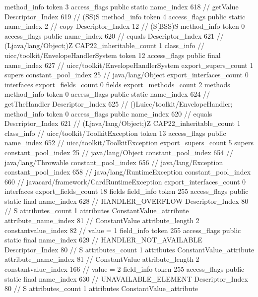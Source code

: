{{{{{				}
				method_info {
					token	3
					access_flags	public static
					name_index	618		// getValue
					Descriptor_Index	619		// (SS)S
				}
				method_info {
					token	4
					access_flags	public static
					name_index	2		// copy
					Descriptor_Index	12		// (S[BSS)S
				}
				method_info {
					token	0
					access_flags	public
					name_index	620		// equals
					Descriptor_Index	621		// (Ljava/lang/Object;)Z
				}
			}
			CAP22_inheritable_count	1
		}
		class_info {		// uicc/toolkit/EnvelopeHandlerSystem
			token	12
			access_flags	public final
			name_index	627		// uicc/toolkit/EnvelopeHandlerSystem
			export_supers_count	1
			supers {
				constant_pool_index	25		// java/lang/Object
			}
			export_interfaces_count	0
			interfaces {
			}
			export_fields_count	0
			fields {
			}
			export_methods_count	2
			methods {
				method_info {
					token	0
					access_flags	public static
					name_index	624		// getTheHandler
					Descriptor_Index	625		// ()Luicc/toolkit/EnvelopeHandler;
				}
				method_info {
					token	0
					access_flags	public
					name_index	620		// equals
					Descriptor_Index	621		// (Ljava/lang/Object;)Z
				}
			}
			CAP22_inheritable_count	1
		}
		class_info {		// uicc/toolkit/ToolkitException
			token	13
			access_flags	public
			name_index	652		// uicc/toolkit/ToolkitException
			export_supers_count	5
			supers {
				constant_pool_index	25		// java/lang/Object
				constant_pool_index	654		// java/lang/Throwable
				constant_pool_index	656		// java/lang/Exception
				constant_pool_index	658		// java/lang/RuntimeException
				constant_pool_index	660		// javacard/framework/CardRuntimeException
			}
			export_interfaces_count	0
			interfaces {
			}
			export_fields_count	18
			fields {
			field_info {
				token	255
				access_flags	public static final
				name_index	628		// HANDLER_OVERFLOW
				Descriptor_Index	80		// S
				attributes_count	1
				attributes {
				ConstantValue_attribute {
					attribute_name_index	81		// ConstantValue
					attribute_length	2
					constantvalue_index	82		// value = 1
				}
				}
			}
			field_info {
				token	255
				access_flags	public static final
				name_index	629		// HANDLER_NOT_AVAILABLE
				Descriptor_Index	80		// S
				attributes_count	1
				attributes {
				ConstantValue_attribute {
					attribute_name_index	81		// ConstantValue
					attribute_length	2
					constantvalue_index	166		// value = 2
				}
				}
			}
			field_info {
				token	255
				access_flags	public static final
				name_index	630		// UNAVAILABLE_ELEMENT
				Descriptor_Index	80		// S
				attributes_count	1
				attributes {
				ConstantValue_attribute {
}}}}}}}
